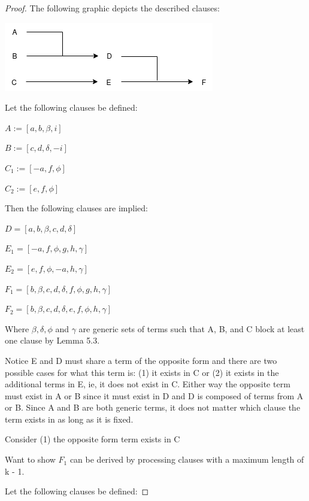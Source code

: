 \documentclass[manuscript]{acmart}
\begin{document}
    \begin{proof}
        The following graphic depicts the described clauses:

        \includegraphics[scale=0.8]{518a}

        Let the following clauses be defined:

        $A := [a, b, \beta, i]$

        $B := [c, d, \delta, -i]$

        $C_1 := [-a, f, \phi]$
        
        $C_2 := [e, f, \phi]$
        
        Then the following clauses are implied:
        
        $D = [a, b, \beta, c, d, \delta]$
        
        $E_1 = [-a, f, \phi, g, h, \gamma]$
        
        $E_2 = [e, f, \phi, -a, h, \gamma]$
        
        $F_1 = [b, \beta, c, d, \delta, f, \phi, g, h, \gamma]$
        
        $F_2 = [b, \beta, c, d, \delta, e, f, \phi, h, \gamma]$
        
        Where $\beta, \delta, \phi$ and $\gamma$ are generic sets of terms
        such that A, B, and C block at least one clause by Lemma 5.3.
        
        Notice E and D must share a term of the opposite form and there
        are two possible cases for what this term is: (1) it exists in
        C or (2) it exists in the additional terms in E, ie, it does not
        exist in C. Either way the opposite term must exist in A or B
        since it must exist in D and D is composed of terms from A or B.
        Since A and B are both generic terms, it does not matter which
        clause the term exists in as long as it is fixed.

        Consider (1) the opposite form term exists in C

        Want to show $F_1$ can be derived by processing clauses with a maximum
        length of k - 1.

        Let the following clauses be defined:


\end{proof}
\end{document}
